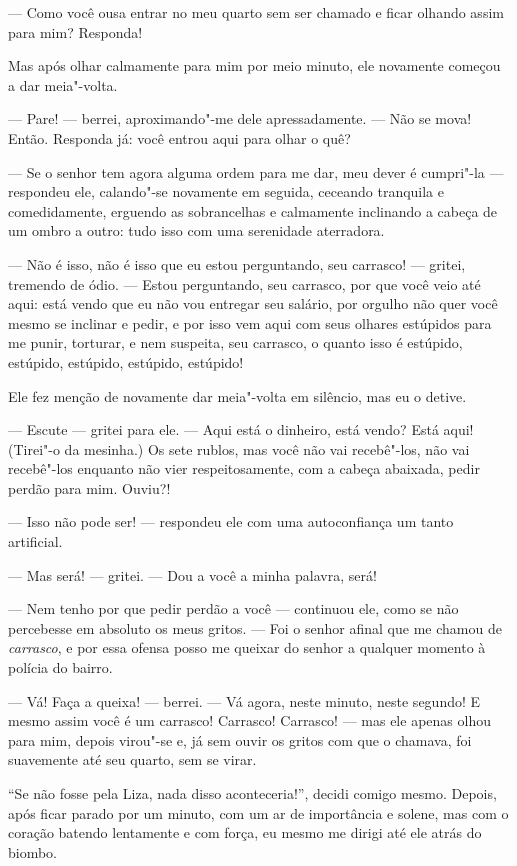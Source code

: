 --- Como você ousa entrar no meu quarto sem ser chamado e ficar olhando
assim para mim? Responda!

Mas após olhar calmamente para mim por meio minuto, ele novamente
começou a dar meia"-volta.

--- Pare! --- berrei, aproximando"-me dele apressadamente. --- Não se mova!
Então. Responda já: você entrou aqui para olhar o quê?

--- Se o senhor tem agora alguma ordem para me dar, meu dever é cumpri"-la
--- respondeu ele, calando"-se novamente em seguida, ceceando tranquila e
comedidamente, erguendo as sobrancelhas e calmamente inclinando a
cabeça de um ombro a outro: tudo isso com uma serenidade aterradora.

--- Não é isso, não é isso que eu estou perguntando, seu carrasco! ---
gritei, tremendo de ódio. --- Estou perguntando, seu carrasco, por que
você veio até aqui: está vendo que eu não vou entregar seu salário, por
orgulho não quer você mesmo se inclinar e pedir, e por isso vem aqui
com seus olhares estúpidos para me punir, torturar, e nem suspeita,
seu carrasco, o quanto isso é estúpido, estúpido, estúpido, estúpido,
estúpido!

Ele fez menção de novamente dar meia"-volta em silêncio, mas eu o detive.

--- Escute --- gritei para ele. --- Aqui está o dinheiro, está vendo? Está
aqui! (Tirei"-o da mesinha.) Os sete rublos, mas você não vai
recebê"-los, não vai recebê"-los enquanto não vier respeitosamente, com
a cabeça abaixada, pedir perdão para mim. Ouviu?!

--- Isso não pode ser! --- respondeu ele com uma autoconfiança um tanto
artificial.

--- Mas será! --- gritei. --- Dou a você a minha palavra, será!

--- Nem tenho por que pedir perdão a você --- continuou ele, como se não
percebesse em absoluto os meus gritos. --- Foi o senhor afinal que me
chamou de \textit{carrasco}, e por essa ofensa posso me queixar do senhor a
qualquer momento à polícia do bairro.

--- Vá! Faça a queixa! --- berrei. --- Vá agora, neste minuto, neste segundo!
E mesmo assim você é um carrasco! Carrasco! Carrasco! --- mas ele apenas
olhou para mim, depois virou"-se e, já sem ouvir os gritos com que o
chamava, foi suavemente até seu quarto, sem se virar.

``Se não fosse pela Liza, nada disso aconteceria!'', decidi comigo mesmo.
Depois, após ficar parado por um minuto, com um ar de importância e
solene, mas com o coração batendo lentamente e com força, eu mesmo me
dirigi até ele atrás do biombo.

